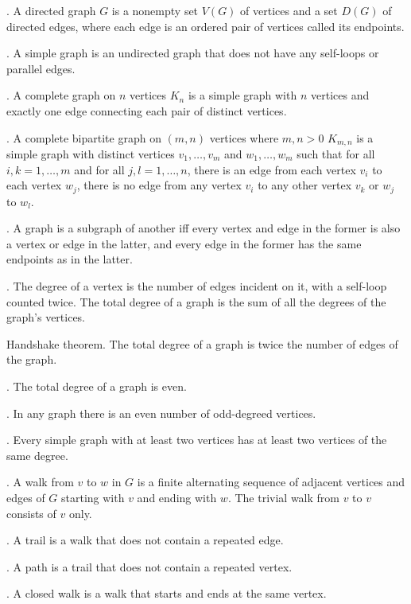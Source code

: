 \documentclass{slnotes}
\begin{document}
. A directed graph \(G\) is a nonempty set \(V(G)\) of vertices and a set \(D(G)\) of directed edges, where each edge is an ordered pair of vertices called its endpoints.

. A simple graph is an undirected graph that does not have any self-loops or parallel edges.

. A complete graph on \(n\) vertices \(K_n\) is a simple graph with \(n\) vertices and exactly one edge connecting each pair of distinct vertices.

. A complete bipartite graph on \((m, n)\) vertices where \(m, n > 0\) \(K_{m,n}\) is a simple graph with distinct vertices \(v_1, \hdots, v_m\) and \(w_1, \hdots, w_m\) such that for all \(i, k = 1, \hdots, m\) and for all \(j, l = 1, \hdots, n\), there is an edge from each vertex \(v_i\) to each vertex \(w_j\), there is no edge from any vertex \(v_i\) to any other vertex \(v_k\) or \(w_j\) to \(w_l\).

. A graph is a subgraph of another iff every vertex and edge in the former is also a vertex or edge in the latter, and every edge in the former has the same endpoints as in the latter.

. The degree of a vertex is the number of edges incident on it, with a self-loop counted twice. The total degree of a graph is the sum of all the degrees of the graph's vertices.

 Handshake theorem. The total degree of a graph is twice the number of edges of the graph.

. The total degree of a graph is even.

. In any graph there is an even number of odd-degreed vertices.

. Every simple graph with at least two vertices has at least two vertices of the same degree.

. A walk from \(v\) to \(w\) in \(G\) is a finite alternating sequence of adjacent vertices and edges of \(G\) starting with \(v\) and ending with \(w\). The trivial walk from \(v\) to \(v\) consists of \(v\) only.

. A trail is a walk that does not contain a repeated edge.

. A path is a trail that does not contain a repeated vertex.

. A closed walk is a walk that starts and ends at the same vertex.
\end{document}
